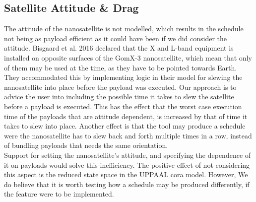 \subsection*{Satellite Attitude \& Drag}
The attitude of the nanosatellite is not modelled, which results in the schedule not being as payload efficient as it could have been if we did consider the attitude. Bisgaard et al. 2016\cite{gomx3} declared that the X and L-band equipment is installed on opposite surfaces of the GomX-3 nanosatellite, which mean that only of them may be used at the time, as they have to be pointed towards Earth. They accommodated this by implementing logic in their model for slewing the nanosatellite into place before the payload was executed. Our approach is to advice the user into including the possible time it takes to slew the satellite before a payload is executed. This has the effect that the worst case execution time of the payloads that are attitude dependent, is increased by that of time it takes to slew into place. Another effect is that the tool may produce a schedule were the nanosatellite has to slew back and forth multiple times in a row, instead of bundling payloads that needs the same orientation.\\
Support for setting the nanosatellite's attitude, and specifying the dependence of it on payloads would solve this inefficiency.
The positive effect of not considering this aspect is the reduced state space in the UPPAAL \gls{cora} model. However, We do believe that it is worth testing how a schedule may be produced differently, if the feature were to be implemented.

